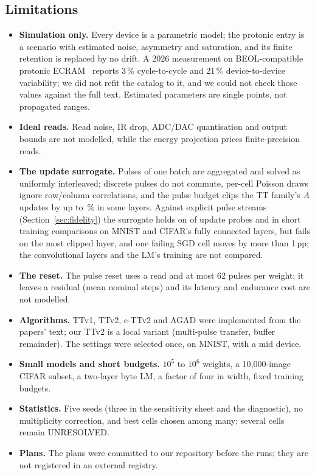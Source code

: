 \subsection{Limitations}\label{sec:limits}
\begin{itemize}
\item \textbf{Simulation only.} Every device is a parametric model; the protonic entry is a scenario with estimated noise,
      asymmetry and saturation, and its finite retention is replaced by no drift. A 2026 measurement on BEOL-compatible
      protonic ECRAM~\cite{xu2026} reports 3\,\% cycle-to-cycle and 21\,\% device-to-device variability; we did not refit the
      catalog to it, and we could not check those values against the full text. Estimated parameters are single points, not
      propagated ranges.
\item \textbf{Ideal reads.} Read noise, IR drop, ADC/DAC quantisation and output bounds are not modelled, while the energy
      projection prices finite-precision reads.
\item \textbf{The update surrogate.} Pulses of one batch are aggregated and solved as uniformly interleaved; discrete pulses do
      not commute, per-cell Poisson draws ignore row/column correlations, and the pulse budget clips the TT family's $A$
      updates by up to \RVLostCifarTtLayerMeanMaxPct\,\% in some layers. Against explicit pulse streams
      (Section~\ref{sec:fidelity}) the surrogate holds on \RXProbeSurPassN{} of \RXProbeN{} update probes and in short training
      comparisons on MNIST and CIFAR's fully connected layers, but fails on the most clipped layer, and one failing SGD cell moves
      by more than 1\,pp; the convolutional layers and the LM's training are not compared.
\item \textbf{The reset.} The pulse reset uses a read and at most 62 pulses per weight; it leaves a residual (mean
      \RVResetResidMean{} nominal steps) and its latency and endurance cost are not modelled.
\item \textbf{Algorithms.} TTv1, TTv2, c-TTv2 and AGAD were implemented from the papers' text; our TTv2 is a local variant
      (multi-pulse transfer, buffer remainder). The settings were selected once, on MNIST, with a mid device.
\item \textbf{Small models and short budgets.} $10^5$ to $10^6$ weights, a 10{,}000-image CIFAR subset, a two-layer byte LM,
      a factor of four in width, fixed training budgets.
\item \textbf{Statistics.} Five seeds (three in the sensitivity sheet and the diagnostic), no multiplicity correction, and best
      cells chosen among many; several cells remain UNRESOLVED.
\item \textbf{Plans.} The plans were committed to our repository before the runs; they are not registered in an external
      registry.
\end{itemize}
